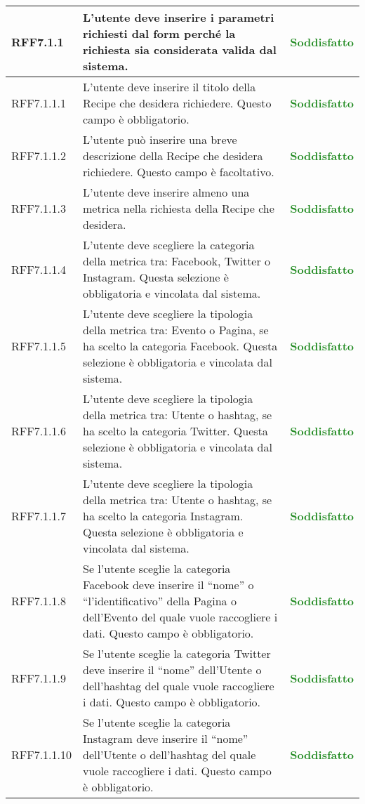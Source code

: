 \begin{center}
\begin{longtable}{| p{2.5cm} | p{8cm} | p{3.5cm} |}
		\hline
		RFF7.1.1 & L'utente deve inserire i parametri richiesti dal form perché la richiesta sia considerata valida dal sistema. & \textbf{\textcolor{forestgreen}{Soddisfatto}}  \\
		\hline
		RFF7.1.1.1 & L'utente deve inserire il titolo della Recipe che desidera richiedere. Questo campo è obbligatorio. & \textbf{\textcolor{forestgreen}{Soddisfatto}} \\
		\hline
		RFF7.1.1.2 & L'utente può inserire una breve descrizione della Recipe che desidera richiedere. Questo campo è facoltativo. & \textbf{\textcolor{forestgreen}{Soddisfatto}} \\
		\hline
		RFF7.1.1.3 & L'utente deve inserire almeno una metrica nella richiesta della Recipe che desidera. & \textbf{\textcolor{forestgreen}{Soddisfatto}} \\
		\hline
		RFF7.1.1.4 & L'utente deve scegliere la categoria della metrica tra: Facebook, Twitter o Instagram. Questa selezione è obbligatoria e vincolata dal sistema. & \textbf{\textcolor{forestgreen}{Soddisfatto}} \\
		\hline
		RFF7.1.1.5 & L'utente deve scegliere la tipologia della metrica tra: Evento o Pagina, se ha scelto la categoria Facebook. Questa selezione è obbligatoria e vincolata dal sistema. & \textbf{\textcolor{forestgreen}{Soddisfatto}} \\
		\hline
		RFF7.1.1.6 & L'utente deve scegliere la tipologia della metrica tra: Utente o hashtag, se ha scelto la categoria Twitter. Questa selezione è obbligatoria e vincolata dal sistema. & \textbf{\textcolor{forestgreen}{Soddisfatto}} \\
		\hline
		RFF7.1.1.7 & L'utente deve scegliere la tipologia della metrica tra: Utente o hashtag, se ha scelto la categoria Instagram. Questa selezione è obbligatoria e vincolata dal sistema. & \textbf{\textcolor{forestgreen}{Soddisfatto}} \\
		\hline
		RFF7.1.1.8 & Se l'utente sceglie la categoria Facebook deve inserire il ``nome'' o ``l'identificativo'' della Pagina o dell'Evento del quale vuole raccogliere i dati. Questo campo è obbligatorio. & \textbf{\textcolor{forestgreen}{Soddisfatto}} \\
		\hline
		RFF7.1.1.9 & Se l'utente sceglie la categoria Twitter deve inserire il ``nome'' dell'Utente o dell'hashtag del quale vuole raccogliere i dati. Questo campo è obbligatorio. & \textbf{\textcolor{forestgreen}{Soddisfatto}} \\
		\hline
		RFF7.1.1.10 & Se l'utente sceglie la categoria Instagram deve inserire il ``nome'' dell'Utente o dell'hashtag del quale vuole raccogliere i dati. Questo campo è obbligatorio. & \textbf{\textcolor{forestgreen}{Soddisfatto}} \\

\end{longtable}
\end{center}
